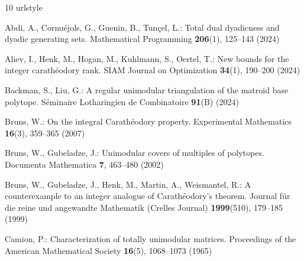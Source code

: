 \documentclass[11pt,a4paper]{amsart}
\theoremstyle{plain}
\theoremstyle{definition}
\begin{document}
\newpage


\begin{thebibliography}{10}
\providecommand{\url}[1]{{#1}}
\providecommand{\urlprefix}{URL }
\expandafter\ifx\csname urlstyle\endcsname\relax
\providecommand{\doi}[1]{DOI~\discretionary{}{}{}#1}\else
\providecommand{\doi}{DOI~\discretionary{}{}{}\begingroup
\urlstyle{rm}\Url}\fi

Abdi, A., Cornu{\'e}jols, G., Guenin, B., Tun{\c c}el, L.: Total dual
dyadicness and dyadic generating sets.
\newblock Mathematical Programming \textbf{206}(1), 125--143 (2024)

Aliev, I., Henk, M., Hogan, M., Kuhlmann, S., Oertel, T.: New bounds for the
integer carathéodory rank.
\newblock SIAM Journal on Optimization \textbf{34}(1), 190–200 (2024)

Backman, S., Liu, G.: A regular unimodular triangulation of the matroid base
polytope.
\newblock Séminaire Lotharingien de Combinatoire \textbf{91}(B) (2024)

Bruns, W.: On the integral {Carath{\'e}odory} property.
\newblock Experimental Mathematics \textbf{16}(3), 359--365 (2007)

Bruns, W., Gubeladze, J.: Unimodular covers of multiples of polytopes.
\newblock Documenta Mathematica \textbf{7}, 463–480 (2002)

Bruns, W., Gubeladze, J., Henk, M., Martin, A., Weismantel, R.: A
counterexample to an integer analogue of {Carath\'e}odory’s theorem.
\newblock Journal für die reine und angewandte Mathematik (Crelles Journal)
\textbf{1999}(510), 179–185 (1999)

Camion, P.: Characterization of totally unimodular matrices.
\newblock Proceedings of the American Mathematical Society \textbf{16}(5),
1068–1073 (1965)


\end{thebibliography}
\end{document}
